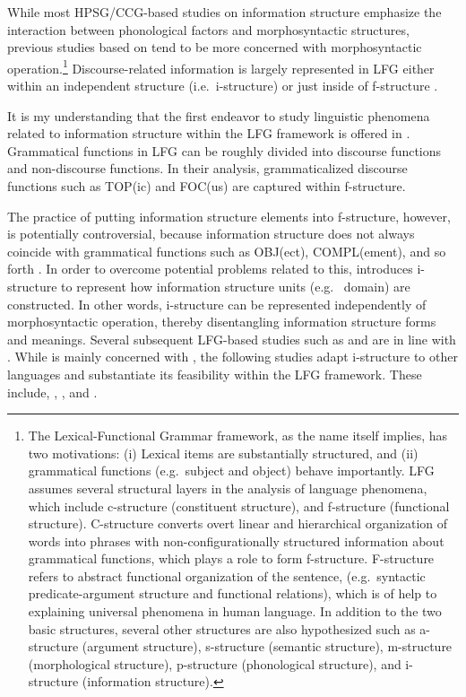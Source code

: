 While most HPSG/CCG-based studies on information structure emphasize
the interaction between phonological factors and morphosyntactic
structures, previous studies based on  tend
to be more concerned with morphosyntactic operation.\footnote{The
  Lexical-Functional Grammar framework, as the name itself implies,
  has two motivations: (i) Lexical items are substantially structured,
  and (ii) grammatical functions (e.g.\ subject and object) behave
  importantly. LFG assumes several structural layers in the analysis
  of language phenomena, which include c-structure (constituent
  structure), and f-structure (functional structure). C-structure
  converts overt linear and hierarchical organization of words into
  phrases with non-configurationally structured information about
  grammatical functions, which plays a role to form
  f-structure. F-structure refers to abstract functional organization
  of the sentence, (e.g.\ syntactic predicate-argument structure and
  functional relations), which is of help to explaining universal
  phenomena in human language. In addition to the two basic
  structures, several other structures are also hypothesized such as
  a-structure (argument structure), s-structure (semantic structure),
  m-structure (morphological structure), p-structure (phonological
  structure), and i-structure (information structure).}
Discourse-related information is largely represented in LFG either
within an independent structure (i.e.\ i-structure) \citep{king:97} or
just inside of f-structure \citep{bresnan:01}.



It is my understanding that the first endeavor to study linguistic
phenomena related to information structure within the LFG framework is
offered in \citet{bresnan:mchombo:87}. Grammatical functions in LFG
can be roughly divided into discourse functions and non-discourse
functions.  In their analysis, grammaticalized discourse functions
such as TOP(ic) and FOC(us) are captured within f-structure.



The practice of putting information structure elements into
f-structure, however, is potentially controversial, because
information structure does not always coincide with grammatical
functions such as OBJ(ect), COMPL(ement), and so forth
\citep{king:zaenen:04}. In order to overcome potential problems
related to this, \citet{king:97} introduces i-structure to represent
how information structure units (e.g.\  domain) are
constructed. In other words, i-structure can be represented
independently of morphosyntactic operation, thereby disentangling
information structure forms and meanings.  Several subsequent
LFG-based studies such as \citet{choi:99} and \cite{man:07} are in
line with \citeauthor{king:97}. While \citeauthor{king:97} is mainly
concerned with , the following studies adapt i-structure
to other languages and substantiate its feasibility within the LFG
framework. These include,  \citep{choi:99}, 
\citep{choi:99}, and  \citep{man:07}.



